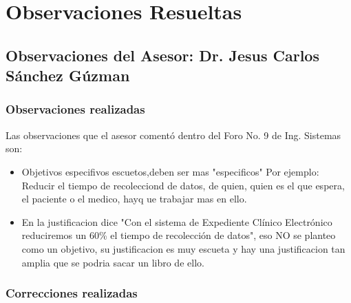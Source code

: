 \chapter{Observaciones Resueltas}


\section{Observaciones del Asesor: Dr. Jesus Carlos Sánchez Gúzman}

    \subsection{Observaciones realizadas}
    Las observaciones que el asesor comentó dentro del Foro No. 9 de Ing. Sistemas son:
    \begin{itemize}
        \item Objetivos especifivos escuetos,deben ser mas "especificos" Por ejemplo: Reducir el tiempo de recolecciond de datos, de quien, quien es el que espera, el paciente o el medico, hayq ue trabajar mas en ello.
        \item En la justificacion dice "Con el sistema de Expediente Clínico Electrónico reduciremos un 60\% el tiempo de recolección de datos", eso NO se planteo como un objetivo, su justificacion es muy escueta y hay una justificacion tan amplia que se podria sacar un libro de ello.
      
    \end{itemize}

    \subsection{Correcciones realizadas}

